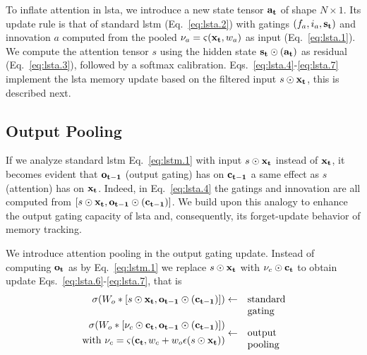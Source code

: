 \documentclass[10pt,twocolumn,letterpaper]{article}
\let\tanh\relax
\DeclareMathOperator\tanh{\eta}
\newcommand{\io}[1]{{\bf #1}}
\begin{document}
To inflate attention in \ac{lsta}, we introduce a new state tensor $\io{a_t}$ of shape $N \times 1$. Its update rule is that of standard \ac{lstm} (Eq.~\ref{eq:lsta.2}) with gatings $(f_a,i_a,\io{s_t})$ and innovation $a$ computed from the pooled $\nu_a = \varsigma(\io{x_t},w_a)$ as input (Eq.~\ref{eq:lsta.1}). We compute the attention tensor $s$ using the hidden state $\io{s_t} \odot \tanh(\io{a_t})$ as residual (Eq.~\ref{eq:lsta.3}), followed by a softmax calibration. Eqs.~\ref{eq:lsta.4}-\ref{eq:lsta.7} implement the \ac{lsta} memory update based on the filtered input $s \odot \io{x_t}$, this is described next.



\subsection{Output Pooling}
\label{sec:pooling}

If we analyze standard \ac{lstm} Eq.~\ref{eq:lstm.1} with input $s\odot\io{x_t}$ instead of $\io{x_t}$, it becomes evident that $\io{o_{t-1}}$ (output gating) has on $\io{c_{t-1}}$ a same effect as $s$ (attention) has on $\io{x_t}$. Indeed, in Eq.~\ref{eq:lsta.4} the gatings and innovation are all computed from $[s \odot \io{x_t}, \io{o_{t-1}} \odot \tanh(\io{c_{t-1}})]$. We build upon this analogy to enhance the output gating capacity of \ac{lsta} and, consequently, its forget-update behavior of memory tracking.

We introduce attention pooling in the output gating update. Instead of computing $\io{o_t}$ as by Eq.~\ref{eq:lstm.1} we replace $s\odot\io{x_t}$ with $\nu_c\odot\io{c_t}$ to obtain update Eqs.~\ref{eq:lsta.6}-\ref{eq:lsta.7}, that is
\begin{eqnarray*}
  \sigma(W_o * [s\odot\io{x_t}, \io{o_{t-1}} \odot \tanh(\io{c_{t-1}})]) &\leftarrow& \parbox[t]{1.3cm}{standard gating}\\
  \begin{matrix*}[r]
    \sigma(W_o * [\nu_c\odot\io{c_t}, \io{o_{t-1}} \odot \tanh(\io{c_{t-1}})])\\[.05in]
    \textrm{with }\nu_c = \varsigma(\io{c_t}, w_c + w_o \epsilon(s \odot \io{x_t}))
  \end{matrix*}
  &\leftarrow& \parbox[t]{1.3cm}{output pooling}
\end{eqnarray*}
\end{document}
